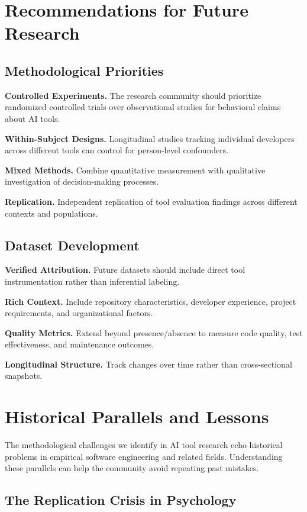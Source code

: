 \documentclass[conference]{IEEEtran}
\begin{document}
\section{Recommendations for Future Research}

\subsection{Methodological Priorities}

\textbf{Controlled Experiments.} The research community should prioritize randomized controlled trials over observational studies for behavioral claims about AI tools.

\textbf{Within-Subject Designs.} Longitudinal studies tracking individual developers across different tools can control for person-level confounders.

\textbf{Mixed Methods.} Combine quantitative measurement with qualitative investigation of decision-making processes.

\textbf{Replication.} Independent replication of tool evaluation findings across different contexts and populations.

\subsection{Dataset Development}

\textbf{Verified Attribution.} Future datasets should include direct tool instrumentation rather than inferential labeling.

\textbf{Rich Context.} Include repository characteristics, developer experience, project requirements, and organizational factors.

\textbf{Quality Metrics.} Extend beyond presence/absence to measure code quality, test effectiveness, and maintenance outcomes.

\textbf{Longitudinal Structure.} Track changes over time rather than cross-sectional snapshots.

\section{Historical Parallels and Lessons}

The methodological challenges we identify in AI tool research echo historical problems in empirical software engineering and related fields. Understanding these parallels can help the community avoid repeating past mistakes.

\subsection{The Replication Crisis in Psychology}
\end{document}
